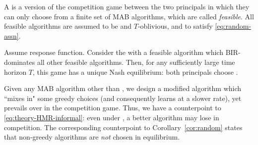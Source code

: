


\begin{definition}\label{def:restricted-competition}
A \emph{\FiniteGame} is a version of the competition game between the two principals in which they can only choose from a finite set of MAB algorithms, which are called \emph{feasible}. All feasible algorithms are assumed to be
\bmonotone and $T$-oblivious, and to satisfy \eqref{eq:random-assn}.
\end{definition}

\begin{corollary}\label{cor:random}
Assume \HardMaxRandom response function. Consider the \FiniteGame with a feasible algorithm \alg which BIR-dominates all other feasible algorithms. Then, for any sufficiently large time horizon $T$, this game has a unique Nash equilibrium: both principals choose \alg.
\end{corollary}



Given any \bmonotone MAB algorithm \alg other than \DynGreedy, we design a modified algorithm which ``mixes in" some greedy choices (and consequently learns at a slower rate), yet prevails over \alg in the competition game. Thus, we have a counterpoint to \eqref{eq:theory-HMR-informal}: even under \HardMaxRandom, a better algorithm may lose in competition. The corresponding counterpoint to Corollary~\ref{cor:random} states that non-greedy algorithms are \emph{not} chosen in equilibrium.

